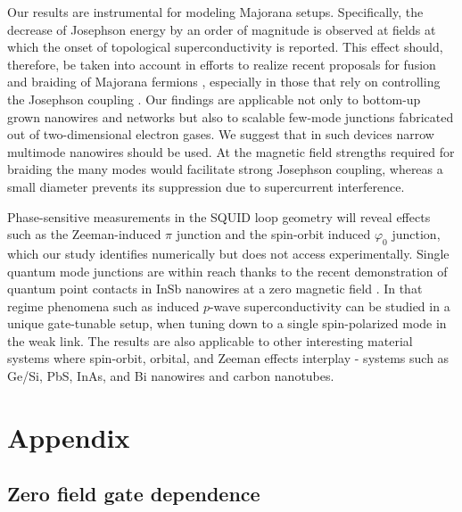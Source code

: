Our results are instrumental for modeling Majorana setups.
Specifically, the decrease of Josephson energy by an order of magnitude is observed at fields at which the onset of topological superconductivity is reported.
This effect should, therefore, be taken into account in efforts to realize recent proposals for fusion and braiding of Majorana fermions \cite{Hyart2013,Aasen2016,Plugge2017b,Karzig2017}, especially in those that rely on controlling the Josephson coupling \cite{Hyart2013,Aasen2016,Plugge2017b}.
Our findings are applicable not only to bottom-up grown nanowires and networks but also to scalable few-mode junctions fabricated out of two-dimensional electron gases. \cite{Nichele2017,Lee2017}
We suggest that in such devices narrow multimode nanowires should be used.
At the magnetic field strengths required for braiding the many modes would facilitate strong Josephson coupling, whereas a small diameter prevents its suppression due to supercurrent interference.

Phase-sensitive measurements in the SQUID loop geometry will reveal effects  such as the Zeeman-induced  $\pi$ junction and the spin-orbit induced $\varphi_0$ junction, which our study identifies numerically but does not access experimentally.
Single quantum mode junctions are within reach thanks to the recent demonstration of quantum point contacts in InSb nanowires at a zero magnetic field \cite{Kammhuber2016}.
In that regime phenomena such as induced $p$-wave superconductivity can be studied in a unique gate-tunable setup, when tuning down to a single spin-polarized mode in the weak link.
The results are also applicable to other interesting material systems where spin-orbit, orbital,  and Zeeman effects interplay - systems such as Ge/Si, PbS, InAs, and  Bi nanowires and carbon nanotubes. \cite{Cleuziou2006}

\section{Appendix}\label{sec:appendix}

\subsection{Zero field gate dependence}


